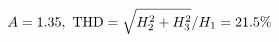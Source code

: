 \documentclass[preview]{standalone}
\begin{document}
\begin{align*}
\special{dvisvgm:raw <g id='unique000'>}A=1.35,\ \text{THD}=\sqrt{H_2^2+H_3^2}/H_1=21.5\%\special{dvisvgm:raw </g>}
\end{align*}
\end{document}
